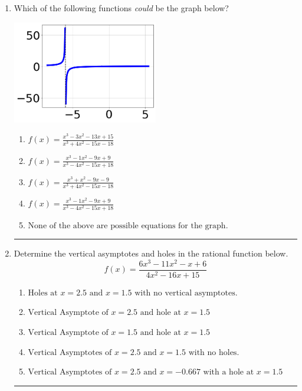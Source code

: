 \documentclass[14pt]{extbook}
\newcommand{\litem}[1]{\item#1\hspace*{-1cm}\rule{\textwidth}{0.4pt}}
\begin{document}
\begin{enumerate}
{\begin{enumerate}[label=\Alph*.]
\end{enumerate} }
\litem{
Which of the following functions \textit{could} be the graph below?
\begin{center}
    \includegraphics[width=0.5\textwidth]{../Figures/identifyGraphOfRationalFunctionC.png}
\end{center}
\begin{enumerate}[label=\Alph*.]
\item \( f(x)=\frac{x^{3} -3 x^{2} -13 x + 15}{x^{3} +4 x^{2} -15 x -18} \)
\item \( f(x)=\frac{x^{3} -1 x^{2} -9 x + 9}{x^{3} -4 x^{2} -15 x + 18} \)
\item \( f(x)=\frac{x^{3} + x^{2} -9 x -9}{x^{3} +4 x^{2} -15 x -18} \)
\item \( f(x)=\frac{x^{3} -1 x^{2} -9 x + 9}{x^{3} -4 x^{2} -15 x + 18} \)
\item \( \text{None of the above are possible equations for the graph.} \)

\end{enumerate} }
\litem{
Determine the vertical asymptotes and holes in the rational function below.\[ f(x) = \frac{6x^{3} -11 x^{2} -x + 6}{4x^{2} -16 x + 15} \]\begin{enumerate}[label=\Alph*.]
\item \( \text{Holes at } x = 2.5 \text{ and } x = 1.5 \text{ with no vertical asymptotes.} \)
\item \( \text{Vertical Asymptote of } x = 2.5 \text{ and hole at } x = 1.5 \)
\item \( \text{Vertical Asymptote of } x = 1.5 \text{ and hole at } x = 1.5 \)
\item \( \text{Vertical Asymptotes of } x = 2.5 \text{ and } x = 1.5 \text{ with no holes.} \)
\item \( \text{Vertical Asymptotes of } x = 2.5 \text{ and } x = -0.667 \text{ with a hole at } x = 1.5 \)


\end{enumerate}}
\end{enumerate}
\end{document}

